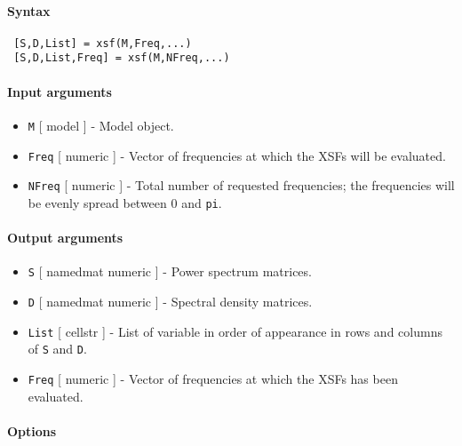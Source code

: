 


	\paragraph{Syntax}
 
 \begin{verbatim}
 [S,D,List] = xsf(M,Freq,...)
 [S,D,List,Freq] = xsf(M,NFreq,...)
 \end{verbatim}
 
 \paragraph{Input arguments}
 
 \begin{itemize}
 \item
   \texttt{M} {[} model {]} - Model object.
 \item
   \texttt{Freq} {[} numeric {]} - Vector of frequencies at which the
   XSFs will be evaluated.
 \item
   \texttt{NFreq} {[} numeric {]} - Total number of requested
   frequencies; the frequencies will be evenly spread between 0 and
   \texttt{pi}.
 \end{itemize}
 
 \paragraph{Output arguments}
 
 \begin{itemize}
 \item
   \texttt{S} {[} namedmat \textbar{} numeric {]} - Power spectrum
   matrices.
 \item
   \texttt{D} {[} namedmat \textbar{} numeric {]} - Spectral density
   matrices.
 \item
   \texttt{List} {[} cellstr {]} - List of variable in order of
   appearance in rows and columns of \texttt{S} and \texttt{D}.
 \item
   \texttt{Freq} {[} numeric {]} - Vector of frequencies at which the
   XSFs has been evaluated.
 \end{itemize}
 
 \paragraph{Options}
 
